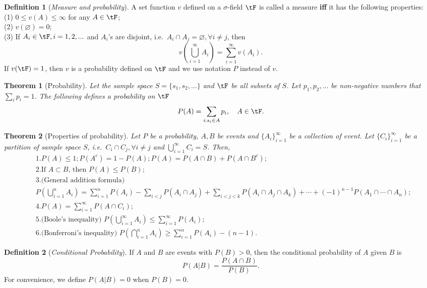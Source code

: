 \documentclass[11pt]{article}
\theoremstyle{plain}
\newtheorem{thm}{Theorem}[section]
\theoremstyle{definition}
\newtheorem{defn}{Definition}
\begin{document}
\begin{defn}[\textit{Measure and probability}]\label{def:measure}
	A set function $v$ defined on a $\sigma$-field $\tF$ is called a measure \textbf{iff} it has the following properties:\\
	(1) $0 \leq v(A) \leq \infty$ for any $A \in \tF$;
	\\ (2) $v(\varnothing) = 0$;
	\\(3) If $A_i \in \tF,i = 1,2,...$ and $A_i$'s  are disjoint, i.e.\ $A_i \cap A_j = \varnothing, \forall i\neq j$, then 
	\[ v(\bigcup_{i=1}^{\infty} A_i ) = \sum_{i=1}^{\infty} v(A_i). \]
	If $v(\tF) = 1$, then $v$ is a probability defined on $\tF$ and we use notation $P$ instead of $v$. 
\end{defn}

\begin{thm}[Probability]\label{thm:probability}
	Let the sample space $S = \{s_1, s_2,...\}$ and $\tF$ be all subsets of $S$. Let $p_1, p_2,...$ be non-negative numbers that $\sum_i p_i = 1 $. The following defines a probability on $\tF$
	\[ P(A) = \sum_{i: s_i \in A} p_i, \quad A \in \tF. \]
\end{thm}

\begin{thm}[Properties of probability]
Let $P$ be a probability, $A,B$ be events and $\{A_i\}_{i=1}^{\infty}$ be a collection of event. Let $\{C_i\}_{i=1}^{\infty}$ be a partition of sample space $S$, i.e.\ $C_i \cap C_j, \forall i\neq j$ and $\bigcup_{i=1}^{\infty} C_i = S$.   Then, 
\begin{align}
&1. P(A) \leq 1; P(A^c) = 1 - P(A); P(A) = P(A \cap B) + P(A \cap B^c);\\
&2. \text{If } A \subset B\text{, then }P(A) \leq P(B); \\
&3. \text{(General addition formula)}\\
&P(\bigcup_{i = 1}^n A_i) = \sum_{i = 1}^n P(A_i) - \sum_{i < j} P(A_i \cap A_j) + \sum_{i<j<k} P(A_i \cap A_j \cap A_k) + \cdots +(-1)^{n-1} P(A_1 \cap \cdots \cap A_n);\\	
&4. P(A) = \sum_{i=1}^{\infty} P(A \cap C_i); \\
&5. \text{(Boole's inequality) } P(\bigcup_{i=1}^{\infty} A_i) \leq \sum_{i=1}^{\infty} P(A_i);\\
&6. \text{(Bonferroni's inequality) } P(\bigcap_{i=1}^n A_i) \geq \sum_{i=1}^n P(A_i) - (n-1).
\end{align}
\end{thm}

\begin{defn}[\textit{Conditional Probability}]\label{def:condprobability}
If $A$ and $B$ are events with $P(B) > 0$, then the conditional probability of $A$ given $B$ is \[ P(A | B) = \frac{P(A\cap B)}{P(B)}. \]
For convenience, we define $P(A|B) = 0$ when $P(B) = 0$.
\end{defn}
\end{document}

